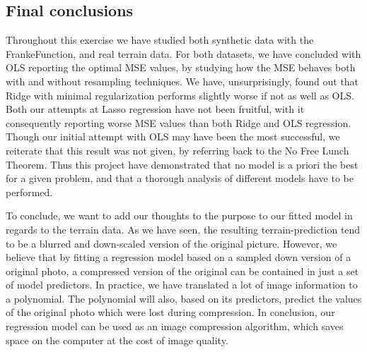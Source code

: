 \documentclass[11pt, a4paper]{article}
\begin{document}
\subsection*{Final conclusions}
Throughout this exercise we have studied both synthetic data with the FrankeFunction, and real terrain data. For both datasets, we have concluded with OLS reporting the optimal MSE values, by studying how the MSE behaves both with and without resampling techniques. We have, unsurprisingly, found out that Ridge with minimal regularization performs slightly worse if not as well as OLS. Both our attempts at Lasso regression have not been fruitful, with it consequently reporting worse MSE values than both Ridge and OLS regression. Though our initial attempt with OLS may have been the most successful, we reiterate that this result was not given, by referring back to the No Free Lunch Theorem. Thus this project have demonstrated that no model is a priori the best for a given problem, and that a thorough analysis of different models have to be performed.

To conclude, we want to add our thoughts to the purpose to our fitted model in regards to the terrain data. As we have seen, the resulting terrain-prediction tend to be a blurred and down-scaled version of the original picture. However, we believe that by fitting a regression model based on a sampled down version of a original photo, a compressed version of the original can be contained in just a set of model predictors. In practice, we have translated a lot of image information to a polynomial. The polynomial will also, based on its predictors, predict the values of the original photo which were lost during compression. In conclusion, our regression model can be used as an image compression algorithm, which saves space on the computer at the cost of image quality. 

\newpage
\newpage



\end{document}
